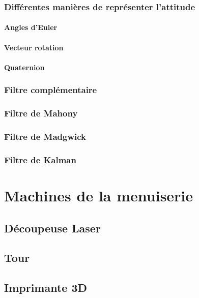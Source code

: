 \documentclass[a4paper, 11pt]{report}
\begin{document}
\section{Différentes manières de représenter l'attitude}

\subsection{Angles d'Euler}

\subsection{Vecteur rotation}

\subsection{Quaternion}

\section{Filtre complémentaire}

\section{Filtre de Mahony}

\section{Filtre de Madgwick}

\section{Filtre de Kalman}

\part{Machines de la menuiserie}

\chapter{Découpeuse Laser}

\chapter{Tour}

\chapter{Imprimante 3D}
\end{document}
